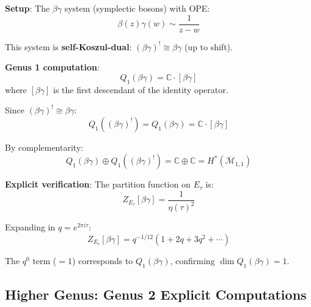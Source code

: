 \begin{example}
\label{ex:betagamma-self-dual-complementarity}

\textbf{Setup}: The $\beta\gamma$ system (symplectic bosons) with OPE:
\begin{equation}
\beta(z)\gamma(w) \sim \frac{1}{z-w}
\end{equation}

This system is \textbf{self-Koszul-dual}: $(\beta\gamma)^! \cong \beta\gamma$ (up to 
shift).

\textbf{Genus 1 computation}:
\begin{equation}
Q_1(\beta\gamma) = \mathbb{C} \cdot [\beta\gamma]
\end{equation}
where $[\beta\gamma]$ is the first descendant of the identity operator.

Since $(\beta\gamma)^! \cong \beta\gamma$:
\begin{equation}
Q_1((\beta\gamma)^!) = Q_1(\beta\gamma) = \mathbb{C} \cdot [\beta\gamma]
\end{equation}

By complementarity:
\begin{equation}
Q_1(\beta\gamma) \oplus Q_1((\beta\gamma)^!) = \mathbb{C} \oplus \mathbb{C} = H^*(
\overline{\mathcal{M}}_{1,1})
\end{equation}

\textbf{Explicit verification}: The partition function on $E_\tau$ is:
\begin{equation}
Z_{E_\tau}[\beta\gamma] = \frac{1}{\eta(\tau)^2}
\end{equation}

Expanding in $q = e^{2\pi i \tau}$:
\begin{equation}
Z_{E_\tau}[\beta\gamma] = q^{-1/12} (1 + 2q + 3q^2 + \cdots)
\end{equation}

The $q^0$ term ($= 1$) corresponds to $Q_1(\beta\gamma)$, confirming 
$\dim Q_1(\beta\gamma) = 1$.
\end{example}

\subsection{Higher Genus: Genus 2 Explicit Computations}

